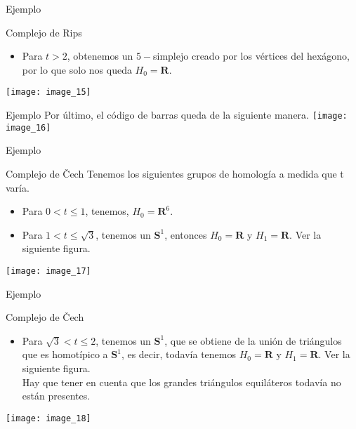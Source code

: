 \documentclass{beamer}
\begin{document}
\begin{frame}{Ejemplo}
    \begin{block}{Complejo de Rips}
       \begin{itemize}
           \item Para $t > 2$, obtenemos un $5-$simplejo creado por los vértices del hexágono, por lo que solo nos queda $H_0 = \mathbf{R}$.
       \end{itemize}
    \end{block}
    \newline
    \pause
    \texttt{[image: image\_15]}
\end{frame}


\begin{frame}{Ejemplo}
    Por último, el código de barras queda de la siguiente manera.
    \newline
    \pause
    \texttt{[image: image\_16]}
\end{frame}

\begin{frame}{Ejemplo}
    \begin{block}{Complejo de \v{C}ech}
       Tenemos los siguientes grupos de homología a medida que t varía.
       \newline
       \pause

       \begin{itemize}
           \item Para $0< t \leq 1$, tenemos, $H_{0}=\mathbf{R}^{6}$.
           \pause
           \item Para $1<t \leq \sqrt{3}$, tenemos un $\mathbf{S}^{1}$, entonces $H_{0}=\mathbf{R}$ y $H_{1}=\mathbf{R}$. Ver la siguiente figura.
       \end{itemize}
    \end{block}
    \pause
    \texttt{[image: image\_17]}
\end{frame}

\begin{frame}{Ejemplo}
    \begin{block}{Complejo de \v{C}ech}
       \begin{itemize}
           \item Para $\sqrt{3} < t \leq 2$, tenemos un $\mathbf{S}^{1}$, que se obtiene de la unión de triángulos que es homotípico a $\mathbf{S}^{1}$, es decir, todavía tenemos
           $H_{0}=\mathbf{R}$ y $H_{1}=\mathbf{R}$. 
           Ver la siguiente figura.\\
           
           \pause
           Hay que tener en cuenta que los grandes triángulos equiláteros todavía no están presentes.
       \end{itemize}
    \end{block}
    \pause
    \texttt{[image: image\_18]}
\end{frame}
\end{document}
